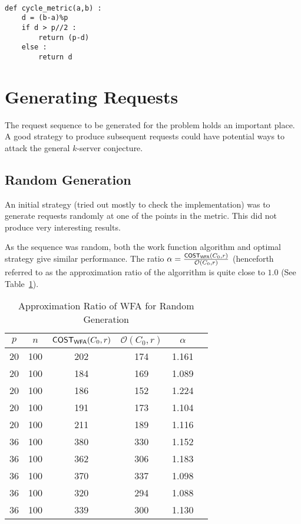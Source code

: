 \lstset{language=Python}          %

\begin{lstlisting}[caption=Code for distance function of a cycle with $p$ points , frame=single]  % Start your code-block

def cycle_metric(a,b) :
	d = (b-a)%p
	if d > p//2 :
		return (p-d)	
	else :
		return d
\end{lstlisting}



\section{Generating Requests}\label{sec:generating-requests}

The request sequence to be generated for the problem holds an important place. A good strategy to produce subsequent requests could have potential ways to attack the general $k$-server conjecture. 

\subsection{Random Generation}
An initial strategy (tried out mostly to check the implementation) was to generate requests randomly at one of the points in the metric. This did not produce very interesting results. 

As the sequence was random, both the work function algorithm and optimal strategy give similar performance. The ratio $\alpha = \frac{\sf{COST}_{\sf{WFA}} (C_0,r)}{\mathcal{O}(C_0,r)}$ (henceforth referred to as the approximation ratio of the algorrithm is quite close to $1.0$ (See Table~\ref{tab:random-approx-ratio}).

\begin{table}[!ht]
\begin{center}
\begin{tabular}{|c|c|c|c|c|c|}
\hline
$p$ & $n$ & $\sf{COST}_{\sf{WFA}} (C_0,r)$ & $\mathcal{O}(C_0,r)$ & $\alpha$ \\
\hline
20 & 100 & 202 & 174 & 1.161 \\
20 & 100 & 184 & 169 & 1.089 \\
20 & 100 & 186 & 152 & 1.224 \\
20 & 100 & 191 & 173 & 1.104 \\
20 & 100 & 211 & 189 & 1.116 \\
36 & 100 & 380 & 330 & 1.152 \\
36 & 100 & 362 & 306 & 1.183 \\
36 & 100 & 370 & 337 & 1.098 \\
36 & 100 & 320 & 294 & 1.088 \\
36 & 100 & 339 & 300 & 1.130 \\
\hline
\end{tabular}
\caption{Approximation Ratio of WFA for Random Generation}
\label{tab:random-approx-ratio}
\end{center}
\end{table}

